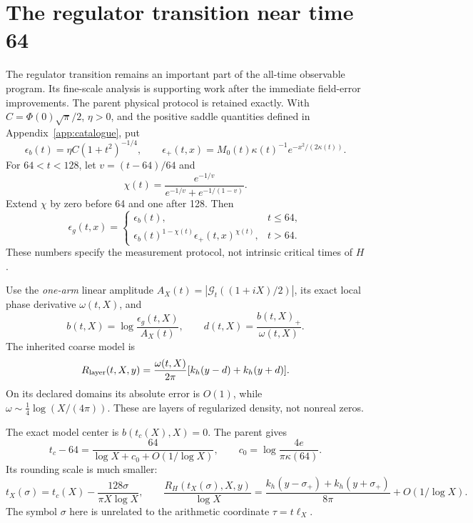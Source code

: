 \documentclass[11pt]{article}
\newcommand{\epsg}{\epsilon_g}
\newcommand{\Gc}{\mathcal G}
\numberwithin{equation}{section}
\begin{document}
\section{The regulator transition near time 64}
\label{sec:regulator}
The regulator transition remains an important part of the all-time
observable program. Its fine-scale analysis is supporting work after
the immediate field-error improvements. The parent physical protocol
is retained exactly. With
\(C=\Phi(0)\sqrt\pi/2\), \(\eta>0\), and the positive saddle quantities
defined in Appendix~\ref{app:catalogue}, put
\[
\epsilon_b(t)=\eta C(1+t^2)^{-1/4},\qquad
\epsilon_+(t,x)=M_0(t)\kappa(t)^{-1}e^{-x^2/(2\kappa(t))}.
\]
For \(64<t<128\), let \(v=(t-64)/64\) and
\[
\chi(t)=\frac{e^{-1/v}}{e^{-1/v}+e^{-1/(1-v)}}.
\]
Extend \(\chi\) by zero before 64 and one after 128. Then
\begin{equation}
\epsg(t,x)=
\begin{cases}
\epsilon_b(t),&t\le64,\\
\epsilon_b(t)^{1-\chi(t)}\epsilon_+(t,x)^{\chi(t)},&t>64.
\end{cases}                                      \label{eq:regulator}
\end{equation}
These numbers specify the measurement protocol, not intrinsic critical
times of \(H\).

Use the \emph{one-arm} linear amplitude
\(A_X(t)=|\Gc_t((1+iX)/2)|\), its exact local phase derivative
\(\omega(t,X)\), and
\begin{equation}
b(t,X)=\log\frac{\epsg(t,X)}{A_X(t)},\qquad
d(t,X)=\frac{b(t,X)_+}{\omega(t,X)}.
\end{equation}
The inherited coarse model is
\begin{equation}
R_{\rm layer}(t,X,y)=\frac{\omega(t,X)}{2\pi}
              [k_h(y-d)+k_h(y+d)].                 \label{eq:layers}
\end{equation}
On its declared domains its absolute error is \(O(1)\), while
\(\omega\sim\frac14\log(X/(4\pi))\). These are layers of regularized
density, not nonreal zeros.

The exact model center is \(b(t_c(X),X)=0\).
The parent gives
\begin{equation}
t_c-64=\frac{64}{\log X+c_0+O(1/\log X)},\qquad
c_0=\log\frac{4e}{\pi\kappa(64)}.
\label{eq:center}
\end{equation}
Its rounding scale is much smaller:
\begin{equation}
t_X(\sigma)=t_c(X)-\frac{128\sigma}{\pi X\log X},\qquad
\frac{R_H(t_X(\sigma),X,y)}{\log X}
=\frac{k_h(y-\sigma_+)+k_h(y+\sigma_+)}{8\pi}
 +O(1/\log X).                                    \label{eq:rounding}
\end{equation}
The symbol \(\sigma\) here is unrelated to the arithmetic coordinate
\(\tau=t\ell_X\).
\end{document}

